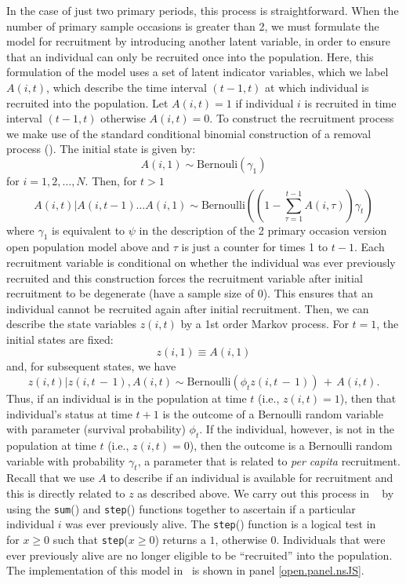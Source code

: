 In the case of just two primary periods, this process is
straightforward.  When the number of primary sample occasions is
greater than 2, we must formulate the model for recruitment by
introducing another latent variable, in order to ensure that an
individual can only be recruited once into the population.  Here, this
formulation of the model uses a set of latent indicator variables,
which we label $A(i,t)$, which describe the time interval $(t-1, t)$
at which individual is recruited into the population.  Let $A(i,t) =
1$ if individual $i$ is recruited in time interval $(t-1, t)$
otherwise $A(i,t)=0$.  To construct the recruitment process we make
use of the standard conditional binomial construction of a removal
process (\citealt{royle_dorazio:2008}).  The initial state is given
by:
\[
   A(i,1) \sim \mbox{Bernouli}(\gamma_{1})
\]
for $i=1,2,\ldots,N$. Then, for $t>1$
\[
 A(i,t)|A(i, t-1) \dots A(i, 1) \sim \mbox{Bernoulli}((1 - \sum_{\tau=1}^{t-1} A(i, \tau) ) \gamma_{t})
\]
where $\gamma_1$ is equivalent to $\psi$ in the description of the 2
primary occasion version open population model above and $\tau$ is
just a counter for times 1 to $t-1$.  Each recruitment variable is
conditional on whether the individual was ever previously recruited
and this construction forces the recruitment variable after initial
recruitment to be degenerate (have a sample size of 0).  This ensures
that an individual cannot be recruited again after initial
recruitment.  Then, we can describe the state variables $z(i,t)$ by a
1st order Markov process.  For $t=1$, the initial states are fixed:
\[
z(i,1) \equiv A(i,1)
\]
and,
 for subsequent states, we have
\[
z(i,t)|z(i,t\,-\,1),A(i,t)
 \sim \mbox{Bernoulli} (\phi_{t} z(i,t\,-\,1)) \,+ \,  A(i,t).
\]
Thus, if an individual is in the population at time $t$ (i.e., $z(i,t)
= 1$), then that individual's status at time $t+1$ is the outcome of a
Bernoulli random variable with parameter (survival probability)
$\phi_{t}$.  If the individual, however, is not in the population at
time $t$ (i.e., $z(i,t) = 0$), then the outcome is a Bernoulli random
variable with probability $\gamma_{t}$, a parameter that is related to
{\it per capita} recruitment.  Recall that we use $A$ to describe if
an individual is available for recruitment and this is directly
related to $z$ as described above.  We carry out this process in
\jags~ by using the \mbox{\tt sum}() and \mbox{\tt step}() functions
together to ascertain if a particular individual $i$ was ever
previously alive.  The \mbox{\tt step}() function is a logical test in
\jags~ for $x \geq 0$ such that \mbox{\tt step}($x \geq 0$) returns a
$1$, otherwise $0$.  Individuals that were ever previously alive are
no longer eligible to be ``recruited'' into the population.  The
implementation of this model in \jags~is shown in panel
\ref{open.panel.nsJS}.


